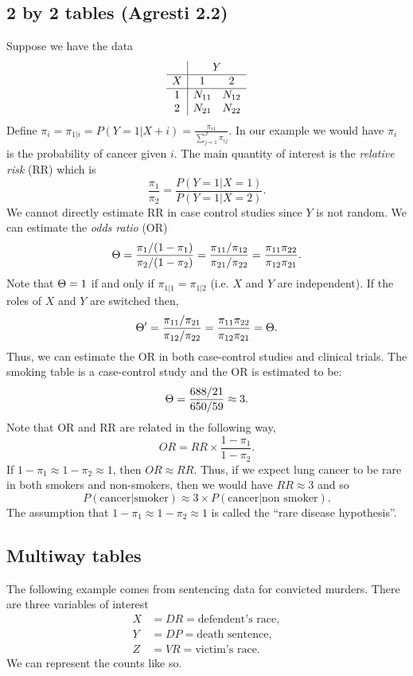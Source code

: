 \subsection{2 by 2 tables (Agresti 2.2)}
Suppose we have the data
\[\begin{array}{c|cc}
    &\multicolumn{2}{c}{Y}\\
    \hline
    X&1&2\\
    \hline
    1&N_{11}&N_{12}\\
    2&N_{21}&N_{22}
\end{array} \]
Define $\pi_i =\pi_{1|i} = P(Y=1|X+i) = \frac{\pi_{i1}}{\sum_{j=1}^J \pi_{ij}}$. In our example we would have $\pi_i$ is the probability of cancer given $i$. The main quantity of interest is the \emph{relative risk} (RR) which is 
\[\frac{\pi_1}{\pi_2} = \frac{P(Y=1|X=1)}{P(Y=1|X=2)}. \]
We cannot directly estimate RR in case control studies since $Y$ is not random. We can estimate the \emph{odds ratio} (OR) 
\[{\Theta} = \frac{\pi_1/(1-\pi_1)}{\pi_2/(1-\pi_2)} = \frac{\pi_{11}/\pi_{12}}{\pi_{21}/\pi_{22}} = \frac{\pi_{11}\pi_{22}}{\pi_{12}\pi_{21}}. \]
Note that ${\Theta}=1$ if and only if $\pi_{1|1}=\pi_{1|2}$ (i.e. $X$ and $Y$ are independent). If the roles of $X$ and $Y$ are switched then,
\[{\Theta}' = \frac{\pi_{11}/\pi_{21}}{\pi_{12}/\pi_{22}} = \frac{\pi_{11}\pi_{22}}{\pi_{12}\pi_{21}}={\Theta}.\]
Thus, we can estimate the OR in both case-control studies and clinical trials. The smoking table is a case-control study and the OR is estimated to be:
\[{\Theta} = \frac{688/21}{650/59} \approx 3. \]
Note that OR and RR are related in the following way,
\[OR = RR \times \frac{1-\pi_1}{1-\pi_2}. \]
If $1-\pi_1\approx 1-\pi_2 \approx 1$, then $OR \approx RR$. Thus, if we expect lung cancer to be rare in both smokers and non-smokers, then we would have $RR \approx 3$ and so 
\[P(\text{cancer}|\text{smoker}) \approx 3 \times P(\text{cancer}|\text{non smoker}). \]
The assumption that $1-\pi_1\approx 1-\pi_2 \approx 1$ is called the ``rare disease hypothesis''.
\subsection{Multiway tables}
The following example comes from sentencing data for convicted murders. There are three variables of interest
\begin{align*}
    X &=DR = \text{defendent's race},\\
    Y&=DP = \text{death sentence},\\
    Z &=VR = \text{victim's race}.
\end{align*}
We can represent the counts like so.

